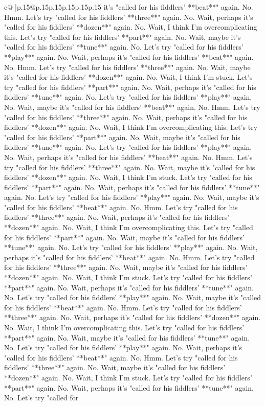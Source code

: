\documentclass{article}
\begin{document}
{\begin{supertabular}{c@{$\;$}|p{.15\linewidth}@{}p{.15\linewidth}p{.15\linewidth}p{.15\linewidth}p{.15\linewidth}p{.15\linewidth}}
{{{it's "called for his fiddlers' **beat**" again. No. Hmm. Let's try "called for his fiddlers' **three**" again. No. Wait, perhaps it's "called for his fiddlers' **dozen**" again. No. Wait, I think I'm overcomplicating this. Let's try "called for his fiddlers' **part**" again. No. Wait, maybe it's "called for his fiddlers' **tune**" again. No. Let's try "called for his fiddlers' **play**" again. No. Wait, perhaps it's "called for his fiddlers' **beat**" again. No. Hmm. Let's try "called for his fiddlers' **three**" again. No. Wait, maybe it's "called for his fiddlers' **dozen**" again. No. Wait, I think I'm stuck. Let's try "called for his fiddlers' **part**" again. No. Wait, perhaps it's "called for his fiddlers' **tune**" again. No. Let's try "called for his fiddlers' **play**" again. No. Wait, maybe it's "called for his fiddlers' **beat**" again. No. Hmm. Let's try "called for his fiddlers' **three**" again. No. Wait, perhaps it's "called for his fiddlers' **dozen**" again. No. Wait, I think I'm overcomplicating this. Let's try "called for his fiddlers' **part**" again. No. Wait, maybe it's "called for his fiddlers' **tune**" again. No. Let's try "called for his fiddlers' **play**" again. No. Wait, perhaps it's "called for his fiddlers' **beat**" again. No. Hmm. Let's try "called for his fiddlers' **three**" again. No. Wait, maybe it's "called for his fiddlers' **dozen**" again. No. Wait, I think I'm stuck. Let's try "called for his fiddlers' **part**" again. No. Wait, perhaps it's "called for his fiddlers' **tune**" again. No. Let's try "called for his fiddlers' **play**" again. No. Wait, maybe it's "called for his fiddlers' **beat**" again. No. Hmm. Let's try "called for his fiddlers' **three**" again. No. Wait, perhaps it's "called for his fiddlers' **dozen**" again. No. Wait, I think I'm overcomplicating this. Let's try "called for his fiddlers' **part**" again. No. Wait, maybe it's "called for his fiddlers' **tune**" again. No. Let's try "called for his fiddlers' **play**" again. No. Wait, perhaps it's "called for his fiddlers' **beat**" again. No. Hmm. Let's try "called for his fiddlers' **three**" again. No. Wait, maybe it's "called for his fiddlers' **dozen**" again. No. Wait, I think I'm stuck. Let's try "called for his fiddlers' **part**" again. No. Wait, perhaps it's "called for his fiddlers' **tune**" again. No. Let's try "called for his fiddlers' **play**" again. No. Wait, maybe it's "called for his fiddlers' **beat**" again. No. Hmm. Let's try "called for his fiddlers' **three**" again. No. Wait, perhaps it's "called for his fiddlers' **dozen**" again. No. Wait, I think I'm overcomplicating this. Let's try "called for his fiddlers' **part**" again. No. Wait, maybe it's "called for his fiddlers' **tune**" again. No. Let's try "called for his fiddlers' **play**" again. No. Wait, perhaps it's "called for his fiddlers' **beat**" again. No. Hmm. Let's try "called for his fiddlers' **three**" again. No. Wait, maybe it's "called for his fiddlers' **dozen**" again. No. Wait, I think I'm stuck. Let's try "called for his fiddlers' **part**" again. No. Wait, perhaps it's "called for his fiddlers' **tune**" again. No. Let's try "called for }}}
\end{supertabular}}
\end{document}
